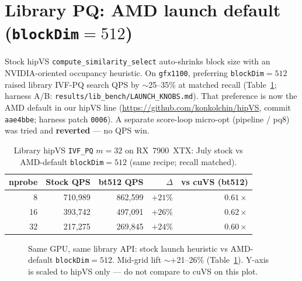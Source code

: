 \documentclass[11pt,a4paper]{article}
\begin{document}
\section{Library PQ: AMD launch default (\texttt{blockDim}${=}512$)}
\label{sec:lib-bt512}

Stock hipVS \texttt{compute\_similarity\_select} auto-shrinks block size with an
NVIDIA-oriented occupancy heuristic. On \texttt{gfx1100}, preferring
\texttt{blockDim}${=}512$ raised library IVF-PQ search QPS by $\sim$25--35\%
at matched recall (Table~\ref{tab:lib-bt512-delta};
harness A/B: \texttt{results/lib\_bench/LAUNCH\_KNOBS.md}).
That preference is now the AMD default in our hipVS line
(\url{https://github.com/konkolchin/hipVS}, commit \texttt{aae4bbe};
harness patch \texttt{0006}). A separate score-loop micro-opt (pipeline / pq8)
was tried and \textbf{reverted} --- no QPS win.

\begin{table}[H]
\centering
\caption{Library hipVS \texttt{IVF\_PQ} $m{=}32$ on RX~7900~XTX:
July stock vs AMD-default \texttt{blockDim}${=}512$ (same recipe; recall matched).}
\label{tab:lib-bt512-delta}
\begin{tabular}{@{}rrrrr@{}}
\toprule
\textbf{nprobe} & \textbf{Stock QPS} & \textbf{bt512 QPS} & \textbf{$\Delta$} & \textbf{vs cuVS (bt512)} \\
\midrule
8  & 710{,}989  & 862{,}599  & $+21\%$ & $0.61\times$ \\
16 & 393{,}742  & 497{,}091  & $+26\%$ & $0.62\times$ \\
32 & 217{,}275  & 269{,}845  & $+24\%$ & $0.60\times$ \\
\bottomrule
\end{tabular}
\end{table}

\begin{figure}[H]
\centering
{}
\caption{Same GPU, same library API: stock launch heuristic vs AMD-default
\texttt{blockDim}${=}512$. Mid-grid lift $\sim$+21--26\% (Table~\ref{tab:lib-bt512-delta}).
Y-axis is scaled to hipVS only --- do not compare to cuVS on this plot.}
\label{fig:lib-pq-bt512}
\end{figure}
\end{document}
